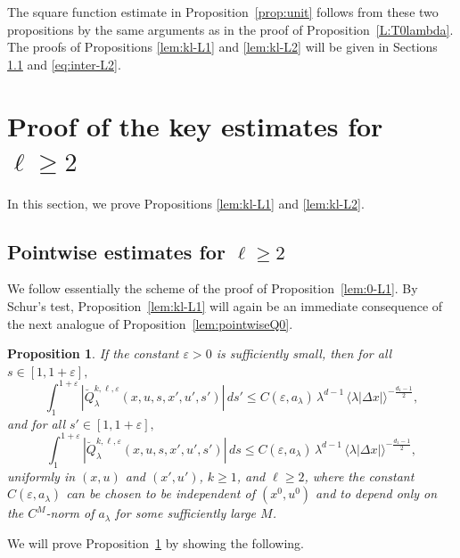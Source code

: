 \documentclass[leqno]{amsart}
\newtheorem{proposition}[theorem]{Proposition}
\theoremstyle{definition}
\theoremstyle{remark}
\numberwithin{equation}{section}
\newcommand\la{{\lambda}}
\newcommand\ve{{\varepsilon}}
\begin{document}
The square function estimate in Proposition~\ref{prop:unit}  follows from these two propositions by the same arguments as in the proof of Proposition~\ref{L:T0lambda}. The proofs of  Propositions \ref{lem:kl-L1} and \ref{lem:kl-L2} will be given in Sections \ref{sec:pointwise-inter} and \ref{eq:inter-L2}. 



\section{Proof of the key estimates for $\ell\ge 2$} 

In this section, we prove Propositions \ref{lem:kl-L1} and \ref{lem:kl-L2}.

\subsection{Pointwise estimates for $\ell\ge 2$}\label{sec:pointwise-inter}

We follow essentially the scheme of the proof of Proposition~\ref{lem:0-L1}. By Schur's test, Proposition~\ref{lem:kl-L1} will again be an immediate consequence  of  the next analogue of Proposition~\ref{lem:pointwiseQ0}.

\begin{proposition}\label{lem:pointwiseQkl} 
If the constant $\ve>0$ is sufficiently small, then for all $s\in[1,1+\ve],$
\begin{equation}\label{sprimeintestkl}
\int_1^{1+\ve}| \breve Q^{k,\ell,\varepsilon}_\la(x,u,s,x',u',s')|\, ds'  
\le C(\ve,a_\la)\, \lambda^{d-1}
\, \langle\lambda\left|\Delta x\right|\rangle^{-\frac{d_1-1}2} ,
\end{equation}
and for all $s'\in[1,1+\ve],$
\begin{equation}\label{sintestkl}
\int_1^{1+\ve}| \breve Q^{k,\ell,\varepsilon}_{\lambda}(x,u,s,x',u',s')|\, ds 
\le C(\ve,a_\la)\, \lambda^{d-1}
\, \langle\lambda\left|\Delta x\right|\rangle^{-\frac{d_1-1}2} ,
\end{equation}
uniformly in $(x,u)$ and $(x',u')$, $k\ge 1$, and $\ell\ge 2$, where the constant $C(\ve,a_\la)$ can be chosen to be independent of $(x^0,u^0)$ and to depend only on the $C^M$-norm of $a_\la$ for some sufficiently large $M$. 
\end{proposition}

We will prove Proposition~\ref{lem:pointwiseQkl} by showing the following.
\end{document}
